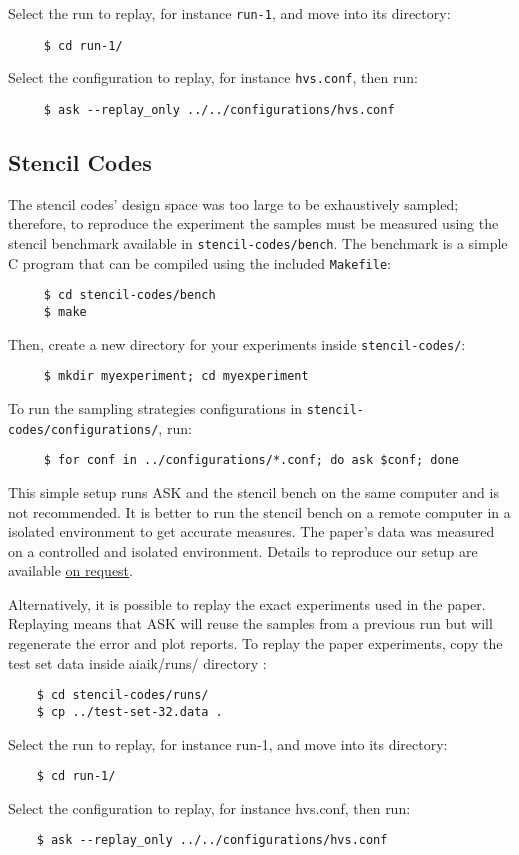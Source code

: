 Select the run to replay, for instance \texttt{run-1}, and move into its directory:
\begin{verbatim}
	 $ cd run-1/
\end{verbatim}

Select the configuration to replay, for instance \texttt{hvs.conf}, then run:
\begin{verbatim}
	 $ ask --replay_only ../../configurations/hvs.conf
\end{verbatim}

\subsection{Stencil Codes}

The stencil codes' design space was too large to be exhaustively sampled; therefore, to reproduce the experiment
the samples must be measured using the stencil benchmark available in \texttt{stencil-codes/bench}.
The benchmark is a simple C program that can be compiled using the included \texttt{Makefile}:
\begin{verbatim}
	 $ cd stencil-codes/bench
	 $ make
\end{verbatim}

Then, create a new directory for your experiments inside \texttt{stencil-codes/}:
\begin{verbatim}
	 $ mkdir myexperiment; cd myexperiment
\end{verbatim}

To run the sampling strategies configurations in \texttt{stencil-codes/configurations/}, run:
\begin{verbatim}
	 $ for conf in ../configurations/*.conf; do ask $conf; done
\end{verbatim}

This simple setup runs ASK and the stencil bench on the same computer and is not recommended. It is better to run the stencil bench on a remote computer in a isolated environment to get accurate measures. The paper's data was measured on a controlled and isolated environment. Details to reproduce our setup are available \href{mailto:ask-team@exascale-computing.eu}{on request}.

Alternatively, it is possible to replay the exact experiments used in the paper. Replaying means that ASK will reuse the samples from a previous run but will regenerate the error and plot reports. 
To replay the paper experiments, copy the test set data inside aiaik/runs/ directory :
\begin{verbatim}
	$ cd stencil-codes/runs/
	$ cp ../test-set-32.data .
\end{verbatim}
Select the run to replay, for instance run-1, and move into its directory:
\begin{verbatim}
	$ cd run-1/
\end{verbatim}
Select the configuration to replay, for instance hvs.conf, then run:
\begin{verbatim}
	$ ask --replay_only ../../configurations/hvs.conf
\end{verbatim}
